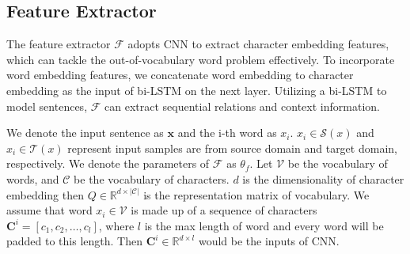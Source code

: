 \documentclass[11pt,letterpaper]{article}
\begin{document}


\subsection{Feature Extractor}
The feature extractor $\mathcal F$ adopts CNN to extract character embedding features, which can tackle the out-of-vocabulary word problem effectively. To incorporate word embedding features, we concatenate word embedding to character embedding as the input of bi-LSTM on the next layer. Utilizing a bi-LSTM to model sentences, $\mathcal{F}$ can extract sequential relations and context information.

We denote the input sentence as $\textbf{x}$ and the i-th word as $x_i$. $x_i \in \mathcal{S}(x)$ and $x_i \in \mathcal{T}(x)$ represent input samples are from source domain and target domain, respectively. We denote the parameters of $\mathcal{F}$ as $\theta_f$. Let $\mathcal{V}$ be the vocabulary of words, and $\mathcal{C}$ be the vocabulary of characters. $d$ is the dimensionality of character embedding then $Q \in \mathbb{R}^{d\times |\mathcal{C}|}$ is the representation matrix of vocabulary. We assume that word $x_i \in \mathcal{V}$ is made up of a sequence of characters $\textbf{C}^i=[c_1,c_2,\dots,c_l]$, where $l$ is the max length of word and every word will be padded to this length. Then $\textbf{C}^i \in \mathbb{R}^{d\times l}$ would be the inputs of CNN.
\end{document}
